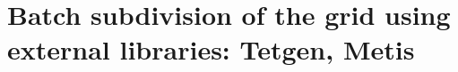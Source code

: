 \chapter{Batch subdivision of the grid using external libraries: Tetgen, Metis}
\label{appendix_integration_batches}